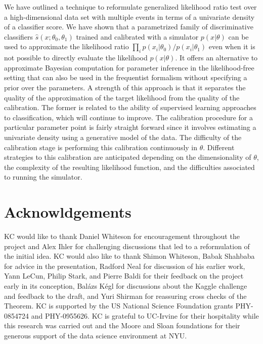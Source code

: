 \documentclass[aoas,preprint]{imsart}
\numberwithin{equation}{section}
\theoremstyle{plain}
\begin{document}
We have outlined a technique to reformulate generalized likelihood ratio test over a high-dimensional data set with multiple events in terms of a univariate density of a classifier score. 
We have shown that a parametrized family of discriminative classifiers $\hat s(x; \theta_0, \theta_1)$ trained and calibrated with a simulator  $p(x|\theta)$ can be used to approximate the  likelihood ratio  $\prod_i p(x_i|\theta_0)/p(x_i|\theta_1)$ even when it is not possible to directly evaluate the likelihood $p(x|\theta)$. 
It offers an alternative to approximate Bayesian computation for parameter inference in the likelihood-free setting that can also be used in the frequentist formalism without specifying a prior over the parameters. A strength of this approach is that it separates the quality of the approximation of the target likelihood from the quality of the calibration. The former is related to the ability of supervised learning approaches to  classification, which will continue to improve. The calibration procedure for a particular parameter point is fairly straight forward since it involves estimating a univariate density using a generative model of the data. The difficulty of the calibration stage is performing this calibration continuously in $\theta$. Different strategies to this calibration are anticipated depending on the dimensionality of $\theta$, the complexity of the resulting likelihood function, and the difficulties associated to running the simulator.




\section*{Acknowldgements}
KC would like to thank  
Daniel Whiteson for encouragement throughout the project and
Alex Ihler for challenging discussions that 
led to a reformulation of the initial idea. KC would also like to thank Shimon Whiteson, Babak Shahbaba for advice in the presentation, Radford Neal for discussion of his earlier work, Yann LeCun, Philip Stark, and Pierre Baldi for their feedback on the
project early in its conception, Bal\'azs K\'egl for discussions about the Kaggle challenge and feedback to the draft, 
and Yuri Shirman for reassuring cross checks of the Theorem. 
KC is supported by the US National Science Foundation grants PHY-0854724 and PHY-0955626. 
KC is grateful to UC-Irvine for their hospitality while this research was carried out and the 
Moore and Sloan foundations for their generous support of the data science environment at NYU.

\newpage

%


\end{document}
